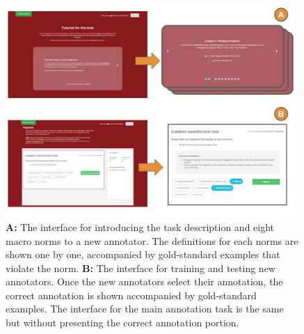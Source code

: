 
\begin{figure}[tb]
  \centering
  \includegraphics[width=0.98\textwidth]{content_minor_revision__Apr2022/images/annotation_interface.jpg}
  \caption{\textbf{A:} The interface for introducing the task description and eight macro norms to a new annotator. The definitions for each norms are shown one by one, accompanied by gold-standard examples that violate the norm. \textbf{B:} The interface for training and testing new annotators. Once the new annotators select their annotation, the correct annotation is shown accompanied by gold-standard examples. The interface for the main annotation task is the same but without presenting the correct annotation portion.}
\end{figure}

